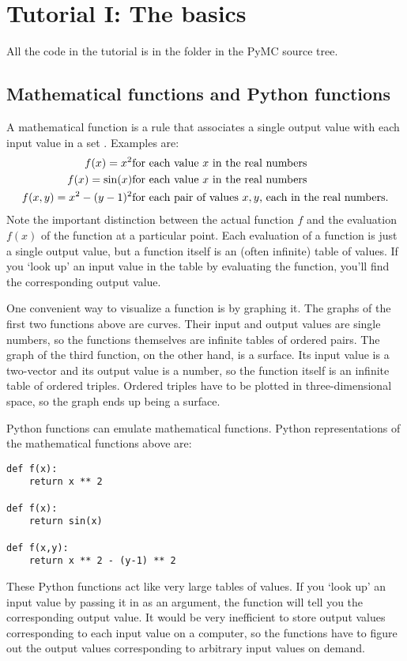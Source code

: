 
\chapter{Tutorial I: The basics}\label{cha:basics} %

All the code in the tutorial is in the folder  in the PyMC source tree.

\section{Mathematical functions and Python functions}\label{sec:functions}
A mathematical function is a rule that associates a single output value with each input value in a set \cite{rudin}. Examples are:
\begin{eqnarray*}
    f(x) = x^2 & \textup{for each value $x$ in the real numbers}  \\
    f(x) = \sin(x)& \textup{for each value $x$ in the real numbers}\\
    f(x,y) = x^2 - (y-1)^2 & \textup{for each pair of values $x,y$, each in the real numbers.}
\end{eqnarray*}
Note the important distinction between the actual function $f$ and the evaluation $f(x)$ of the function at a particular point. Each evaluation of a function is just a single output value, but a function itself is an (often infinite) table of values. If you `look up' an input value in the table by evaluating the function, you'll find the corresponding output value.

One convenient way to visualize a function is by graphing it. The graphs of the first two functions above are curves. Their input and output values are single numbers, so the functions themselves are infinite tables of ordered pairs. The graph of the third function, on the other hand, is a surface. Its input value is a two-vector and its output value is a number, so the function itself is an infinite table of ordered triples. Ordered triples have to be plotted in three-dimensional space, so the graph ends up being a surface.

Python functions can emulate mathematical functions. Python representations of the mathematical functions above are:
\begin{verbatim}
def f(x):
    return x ** 2

def f(x):
    return sin(x)

def f(x,y):
    return x ** 2 - (y-1) ** 2
\end{verbatim}
These Python functions act like very large tables of values. If you `look up' an input value by passing it in as an argument, the function will tell you the corresponding output value. It would be very inefficient to store output values corresponding to each input value on a computer, so the functions have to figure out the output values corresponding to arbitrary input values on demand.


